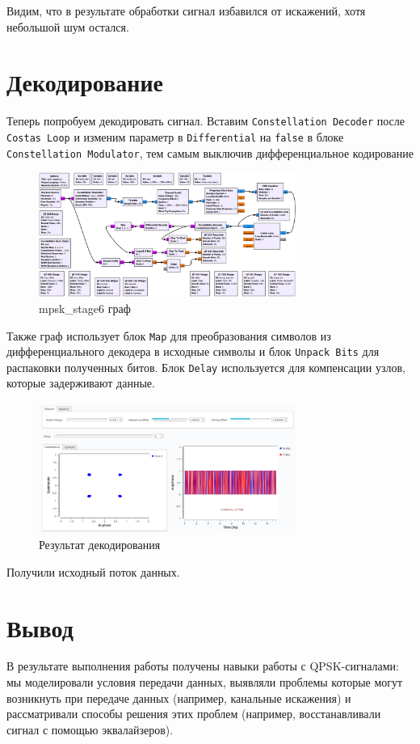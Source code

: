 \documentclass[a4paper,12pt]{article}
\begin{document}
	
	Видим, что в результате обработки сигнал избавился от искажений, хотя небольшой шум остался.
	
	
	\section{Декодирование}
	
	Теперь попробуем декодировать сигнал. Вставим \texttt{Constellation Decoder} после \texttt{Costas Loop} и изменим параметр в \texttt{Differential} на \texttt{false} в блоке \texttt{Constellation Modulator}, тем самым выключив дифференциальное кодирование
	
	\begin{figure}[H]
		\centering
		\includegraphics[width=0.75\textwidth]{7_1.png}
		\caption{mpsk\_stage6 граф}
		\label{fig:7.1}
	\end{figure}
	
	Также граф использует блок \texttt{Map} для преобразования символов из дифференциального декодера в исходные символы и блок \texttt{Unpack Bits} для распаковки полученных битов. Блок \texttt{Delay} используется для компенсации узлов, которые задерживают данные.
	
	\begin{figure}[H]
		\centering
		\includegraphics[width=0.75\textwidth]{7_2.png}
		\caption{Результат декодирования}
		\label{fig:7.2}
	\end{figure}
	
	Получили исходный поток данных.

	\newpage
	
	\section{Вывод}
	
	В результате выполнения работы получены навыки работы с QPSK-сигналами: мы моделировали условия передачи данных, выявляли проблемы которые могут возникнуть при передаче данных (например, канальные искажения) и рассматривали способы решения этих проблем (например, восстанавливали сигнал с помощью эквалайзеров).
	
\end{document}
